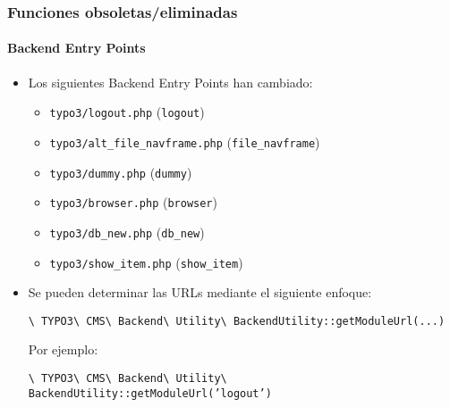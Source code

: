\begin{frame}[fragile]
	\frametitle{Funciones obsoletas/eliminadas}
	\framesubtitle{Backend Entry Points}

	\begin{itemize}

		\item Los siguientes Backend Entry Points han cambiado:

			\begin{itemize}
				\item \texttt{typo3/logout.php}					\tabto{6cm}(\begingroup\color{typo3orange}\texttt{logout}\endgroup)
				\item \texttt{typo3/alt\_file\_navframe.php}	\tabto{6cm}(\begingroup\color{typo3orange}\texttt{file\_navframe}\endgroup)
				\item \texttt{typo3/dummy.php}					\tabto{6cm}(\begingroup\color{typo3orange}\texttt{dummy}\endgroup)
				\item \texttt{typo3/browser.php}				\tabto{6cm}(\begingroup\color{typo3orange}\texttt{browser}\endgroup)
				\item \texttt{typo3/db\_new.php}				\tabto{6cm}(\begingroup\color{typo3orange}\texttt{db\_new}\endgroup)
				\item \texttt{typo3/show\_item.php}				\tabto{6cm}(\begingroup\color{typo3orange}\texttt{show\_item}\endgroup)
			\end{itemize}

		\item Se pueden determinar las URLs mediante el siguiente enfoque:

			\smaller
				\texttt{\textbackslash
					TYPO3\textbackslash
					CMS\textbackslash
					Backend\textbackslash
					Utility\textbackslash
					BackendUtility::getModuleUrl(...)}
			\normalsize

			Por ejemplo:

			\smaller
				\texttt{\textbackslash
					TYPO3\textbackslash
					CMS\textbackslash
					Backend\textbackslash
					Utility\textbackslash
					BackendUtility::getModuleUrl('}\begingroup\color{typo3orange}\texttt{logout}\endgroup\texttt{')}
			\normalsize

	\end{itemize}

\end{frame}


